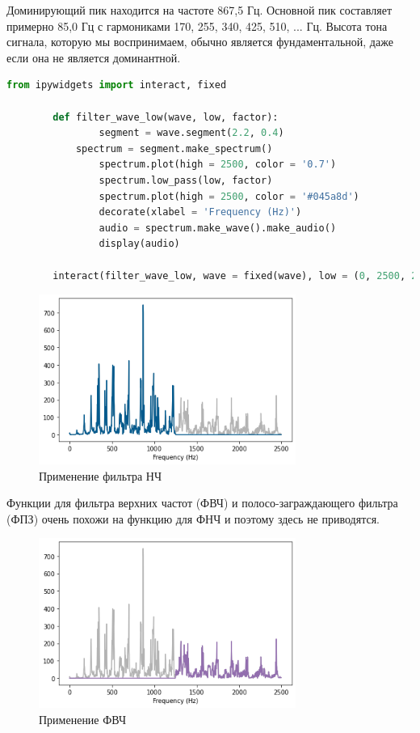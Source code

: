 \documentclass[a4paper, 12pt]{report}
\begin{document}
	Доминирующий пик находится на частоте 867,5 Гц. Основной пик составляет примерно 85,0 Гц с гармониками 170, 255, 340, 425, 510, ... Гц.  Высота тона сигнала, которую мы воспринимаем, обычно является фундаментальной, даже если она не является доминантной.
	\begin{lstlisting}[language=Python,caption=Функция фильтра НЧ]
		from ipywidgets import interact, fixed

		def filter_wave_low(wave, low, factor):
    			segment = wave.segment(2.2, 0.4)
   			spectrum = segment.make_spectrum()
    			spectrum.plot(high = 2500, color = '0.7')
    			spectrum.low_pass(low, factor)
    			spectrum.plot(high = 2500, color = '#045a8d')
    			decorate(xlabel = 'Frequency (Hz)')
    			audio = spectrum.make_wave().make_audio()
    			display(audio)

		interact(filter_wave_low, wave = fixed(wave), low = (0, 2500, 250), factor = (0, 1, 0.05));   
	\end{lstlisting}
	\begin{figure}[H]
		\centering
		\includegraphics[width=0.75\textwidth]{filter1.png}
		\caption{Применение фильтра НЧ}
		\label{fig:filter1}
	\end{figure}
	Функции для фильтра верхних частот (ФВЧ) и полосо-заграждающего фильтра (ФПЗ) очень похожи на функцию для ФНЧ и поэтому здесь не приводятся.
	\begin{figure}[H]
		\centering
		\includegraphics[width=0.75\textwidth]{filter2.png}
		\caption{Применение ФВЧ}
		\label{fig:filter2}
	\end{figure}
\end{document}
